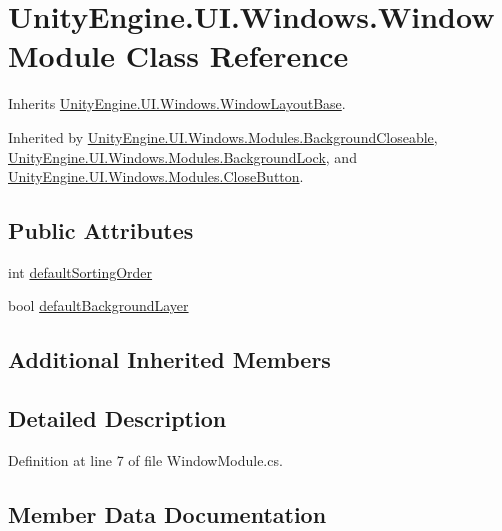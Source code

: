 \hypertarget{class_unity_engine_1_1_u_i_1_1_windows_1_1_window_module}{}\section{Unity\+Engine.\+U\+I.\+Windows.\+Window\+Module Class Reference}
\label{class_unity_engine_1_1_u_i_1_1_windows_1_1_window_module}


Inherits \hyperlink{class_unity_engine_1_1_u_i_1_1_windows_1_1_window_layout_base}{Unity\+Engine.\+U\+I.\+Windows.\+Window\+Layout\+Base}.



Inherited by \hyperlink{class_unity_engine_1_1_u_i_1_1_windows_1_1_modules_1_1_background_closeable}{Unity\+Engine.\+U\+I.\+Windows.\+Modules.\+Background\+Closeable}, \hyperlink{class_unity_engine_1_1_u_i_1_1_windows_1_1_modules_1_1_background_lock}{Unity\+Engine.\+U\+I.\+Windows.\+Modules.\+Background\+Lock}, and \hyperlink{class_unity_engine_1_1_u_i_1_1_windows_1_1_modules_1_1_close_button}{Unity\+Engine.\+U\+I.\+Windows.\+Modules.\+Close\+Button}.

\subsection*{Public Attributes}
\begin{DoxyCompactItemize}
\item 
int \hyperlink{class_unity_engine_1_1_u_i_1_1_windows_1_1_window_module_a2192064ee05783863b735184ad55cf58}{default\+Sorting\+Order}
\item 
bool \hyperlink{class_unity_engine_1_1_u_i_1_1_windows_1_1_window_module_a5692a649044632ac1e828a13c769ea60}{default\+Background\+Layer}
\end{DoxyCompactItemize}
\subsection*{Additional Inherited Members}


\subsection{Detailed Description}


Definition at line 7 of file Window\+Module.\+cs.



\subsection{Member Data Documentation}
\hypertarget{class_unity_engine_1_1_u_i_1_1_windows_1_1_window_module_a5692a649044632ac1e828a13c769ea60}{}
